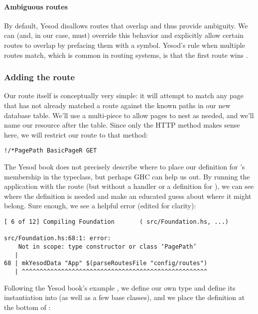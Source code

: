 \paragraph{Ambiguous routes} By default, Yesod disallows routes that overlap and thus provide ambiguity. We can (and, in our case, must) override this behavior and explicitly allow certain routes to overlap by prefacing them with a \code{!} symbol. Yesod's rule when multiple routes match, which is common in routing systems, is that the first route wins \cite{ybkRouting}.

\subsubsection{Adding the route}

Our route itself is conceptually very simple: it will attempt to match any page that has not already matched a route against the known paths in our new database table. We'll use a multi-piece to allow pages to nest as needed, and we'll name our resource after the  table. Since only the  HTTP method makes sense here, we will restrict our route to that method:

\begin{Verbatim}[samepage=true]
!/*PagePath BasicPageR GET
\end{Verbatim}

The Yesod book does not precisely describe where to place our definition for 's membership in the  typeclass, but perhaps GHC can help us out. By running the application with the route (but without a handler or a definition for ), we can see where the definition is needed and make an educated guess about where it might belong. Sure enough, we see a helpful error (edited for clarity):

\begin{Verbatim}[samepage=true]
[ 6 of 12] Compiling Foundation       ( src/Foundation.hs, ...)

src/Foundation.hs:68:1: error:
    Not in scope: type constructor or class ‘PagePath’
   |
68 | mkYesodData "App" $(parseRoutesFile "config/routes")
   | ^^^^^^^^^^^^^^^^^^^^^^^^^^^^^^^^^^^^^^^^^^^^^^^^^^^^

\end{Verbatim}

Following the Yesod book's example \cite{ybkRouting}, we define our own  type and define its instantiation into  (as well as a few base classes), and we place the definition at the bottom of :

